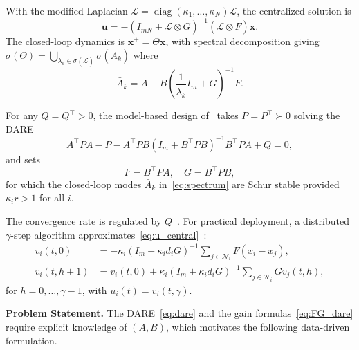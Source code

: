 \documentclass[12pt]{elsarticle}
\theoremstyle{remark}
\DeclareMathOperator{\diag}{diag}
\newcommand{\bx}{\boldsymbol{x}}
\newcommand{\bu}{\boldsymbol{u}}
\begin{document}
With the modified Laplacian $\bar{\mathcal{L}} = \diag(\kappa_1,\ldots,\kappa_N) \mathcal{L}$, the centralized solution is
\begin{equation}
\bu = -(I_{mN} + \bar{\mathcal{L}} \otimes G)^{-1}(\bar{\mathcal{L}} \otimes F)\bx.
\label{eq:u_central}
\end{equation}
The closed-loop dynamics is $\bx^+ = \Theta \bx$, with spectral decomposition \cite[Lemma~3.1]{cacace2024} giving $\sigma(\Theta) = \bigcup_{\bar{\lambda}_k \in \sigma(\bar{\mathcal{L}})} \sigma(\bar{A}_k)$ where
\begin{equation}
\bar{A}_k = A - B\left(\frac{1}{\bar{\lambda}_k}I_m + G\right)^{-1}F.
\label{eq:spectrum}
\end{equation}

For any $Q = Q^\top > 0$, the model-based design of~\cite[Thm.~3.1]{cacace2024} takes $P = P^\top \succ 0$ solving the DARE
\begin{equation}
A^\top P A - P - A^\top PB(I_m + B^\top PB)^{-1}B^\top PA + Q = 0,
\label{eq:dare}
\end{equation}
and sets
\begin{equation}
F = B^\top P A, \quad G = B^\top P B,
\label{eq:FG_dare}
\end{equation}
for which the closed-loop modes $\bar{A}_k$ in~\eqref{eq:spectrum} are Schur stable provided $\kappa_i \bar{r} > 1$ for all $i$.

The convergence rate is regulated by $Q$~\cite[Remark~3.2]{cacace2024}. For practical deployment, a distributed $\gamma$-step algorithm approximates~\eqref{eq:u_central}~\cite{cacace2024}:
\begin{align}
v_i(t,0) &= -\kappa_i(I_m + \kappa_i d_i G)^{-1} \sum_{j \in \mathcal{N}_i} F(x_i - x_j), \label{eq:dist_init} \\
v_i(t,h{+}1) &= v_i(t,0) + \kappa_i(I_m + \kappa_i d_i G)^{-1} \sum_{j \in \mathcal{N}_i} Gv_j(t,h), \label{eq:dist_iter}
\end{align}
for $h = 0, \ldots, \gamma-1$, with $u_i(t) = v_i(t,\gamma)$.

\textbf{Problem Statement.} The DARE~\eqref{eq:dare} and the gain formulas~\eqref{eq:FG_dare} require explicit knowledge of $(A,B)$, which motivates the following data-driven formulation.
\end{document}
